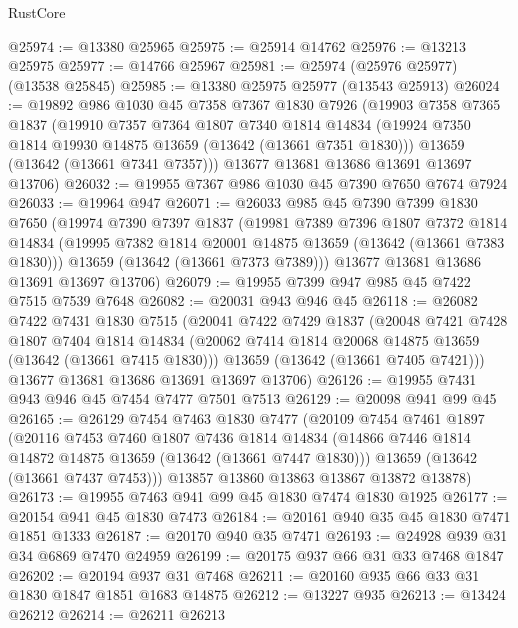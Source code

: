 \begin{lexlean}{RustCore}
\begin{coremodule}
@25974 := @13380 @25965
@25975 := @25914 @14762
@25976 := @13213 @25975
@25977 := @14766 @25967
@25981 := @25974 (@25976 @25977) (@13538 @25845)
@25985 := @13380 @25975 @25977 (@13543 @25913)
@26024 := @19892
    @986
    @1030
    @45
    @7358
    @7367
    @1830
    @7926
    (@19903
      @7358
      @7365
      @1837
      (@19910
        @7357
        @7364
        @1807
        @7340
        @1814
        @14834
        (@19924 @7350 @1814 @19930 @14875 @13659 (@13642 (@13661 @7351 @1830)))
        @13659
        (@13642 (@13661 @7341 @7357)))
      @13677
      @13681
      @13686
      @13691
      @13697
      @13706)
@26032 := @19955 @7367 @986 @1030 @45 @7390 @7650 @7674 @7924
@26033 := @19964 @947
@26071 := @26033
    @985
    @45
    @7390
    @7399
    @1830
    @7650
    (@19974
      @7390
      @7397
      @1837
      (@19981
        @7389
        @7396
        @1807
        @7372
        @1814
        @14834
        (@19995 @7382 @1814 @20001 @14875 @13659 (@13642 (@13661 @7383 @1830)))
        @13659
        (@13642 (@13661 @7373 @7389)))
      @13677
      @13681
      @13686
      @13691
      @13697
      @13706)
@26079 := @19955 @7399 @947 @985 @45 @7422 @7515 @7539 @7648
@26082 := @20031 @943 @946 @45
@26118 := @26082
    @7422
    @7431
    @1830
    @7515
    (@20041
      @7422
      @7429
      @1837
      (@20048
        @7421
        @7428
        @1807
        @7404
        @1814
        @14834
        (@20062 @7414 @1814 @20068 @14875 @13659 (@13642 (@13661 @7415 @1830)))
        @13659
        (@13642 (@13661 @7405 @7421)))
      @13677
      @13681
      @13686
      @13691
      @13697
      @13706)
@26126 := @19955 @7431 @943 @946 @45 @7454 @7477 @7501 @7513
@26129 := @20098 @941 @99 @45
@26165 := @26129
    @7454
    @7463
    @1830
    @7477
    (@20109
      @7454
      @7461
      @1897
      (@20116
        @7453
        @7460
        @1807
        @7436
        @1814
        @14834
        (@14866 @7446 @1814 @14872 @14875 @13659 (@13642 (@13661 @7447 @1830)))
        @13659
        (@13642 (@13661 @7437 @7453)))
      @13857
      @13860
      @13863
      @13867
      @13872
      @13878)
@26173 := @19955 @7463 @941 @99 @45 @1830 @7474 @1830 @1925
@26177 := @20154 @941 @45 @1830 @7473
@26184 := @20161 @940 @35 @45 @1830 @7471 @1851 @1333
@26187 := @20170 @940 @35 @7471
@26193 := @24928 @939 @31 @34 @6869 @7470 @24959
@26199 := @20175 @937 @66 @31 @33 @7468 @1847
@26202 := @20194 @937 @31 @7468
@26211 := @20160 @935 @66 @33 @31 @1830 @1847 @1851 @1683 @14875
@26212 := @13227 @935
@26213 := @13424 @26212
@26214 := @26211 @26213

\end{coremodule}
\end{lexlean}
